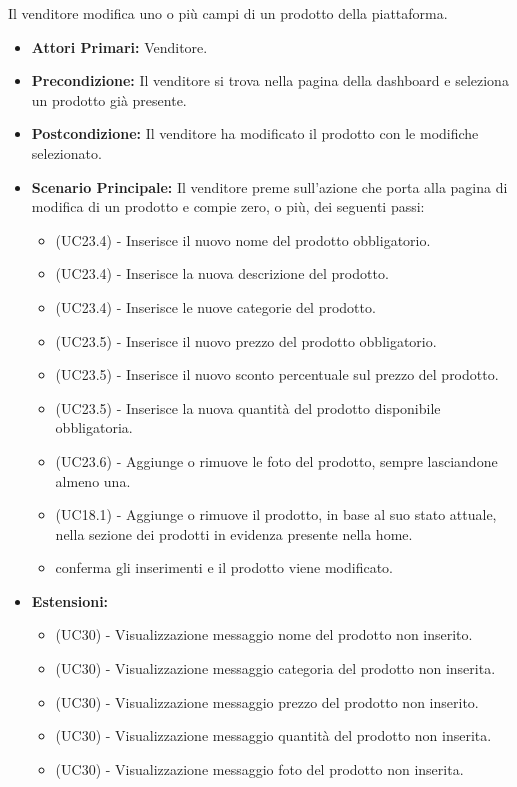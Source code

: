 Il venditore modifica uno o più campi di un prodotto della piattaforma.
\begin{itemize}
    \item \textbf{Attori Primari:} Venditore.
    \item \textbf{Precondizione:} Il venditore si trova nella pagina della dashboard e seleziona un prodotto già presente.
    \item \textbf{Postcondizione:} Il venditore ha modificato il prodotto con le modifiche selezionato.
    \item \textbf{Scenario Principale:} Il venditore preme sull'azione che porta alla pagina di modifica di un prodotto e compie zero, o più, dei seguenti passi:
    \begin{itemize}
        \item (UC23.4) - Inserisce il nuovo nome del prodotto obbligatorio.
        \item (UC23.4) - Inserisce la nuova descrizione del prodotto.
        \item (UC23.4) - Inserisce le nuove categorie del prodotto.
        \item (UC23.5) - Inserisce il nuovo prezzo del prodotto obbligatorio.
        \item (UC23.5) - Inserisce il nuovo sconto percentuale sul prezzo del prodotto.
        \item (UC23.5) - Inserisce la nuova quantità del prodotto disponibile obbligatoria.
        \item (UC23.6) - Aggiunge o rimuove le foto del prodotto, sempre lasciandone almeno una.
        \item (UC18.1) - Aggiunge o rimuove il prodotto, in base al suo stato attuale, nella sezione dei prodotti in evidenza presente nella home.
        \item conferma gli inserimenti e il prodotto viene modificato.
    \end{itemize}
    \item \textbf{Estensioni:}
    \begin{itemize}
        \item (UC30) - Visualizzazione messaggio nome del prodotto non inserito.
        \item (UC30) - Visualizzazione messaggio categoria del prodotto non inserita.
        \item (UC30) - Visualizzazione messaggio prezzo del prodotto non inserito.
        \item (UC30) - Visualizzazione messaggio quantità del prodotto non inserita.
        \item (UC30) - Visualizzazione messaggio foto del prodotto non inserita.
    \end{itemize}
\end{itemize}

